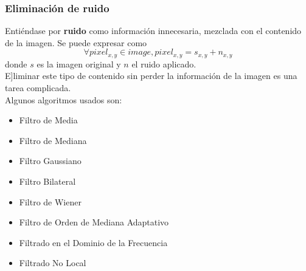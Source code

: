 \documentclass[
10pt, %
aspectratio=169, %
]{beamer}
\begin{document}
	\begin{frame}
		
		\frametitle{Eliminación de ruido}
		
		Entiéndase por \textbf{ruido} como información innecesaria, mezclada con el contenido de la imagen. Se puede expresar como 
		$$\forall pixel_{x,y} \in image, pixel_{x, y} = s_{x,y} + n_{x,y}$$
		donde $s$ es la imagen original y $n$ el ruido aplicado. \\[2mm]
		
		E]liminar este tipo de contenido sin perder la información de la imagen es una tarea complicada. \\[3mm]
		
		\pause
		Algunos algoritmos usados son: \\[2mm]
		
		\begin{minipage}{.4\textwidth}
			\begin{itemize}
				\item Filtro de Media 
				\item Filtro de Mediana
				\item Filtro Gaussiano
				\item Filtro Bilateral
			\end{itemize}
		\end{minipage}%
		\noindent\begin{minipage}{.45\textwidth}
			\begin{itemize}
				\item Filtro de Wiener
				\item Filtro de Orden de Mediana Adaptativo
				\item Filtrado en el Dominio de la Frecuencia
				\item Filtrado No Local
			\end{itemize}
		\end{minipage}%
		
	\end{frame}
	
\end{document}
